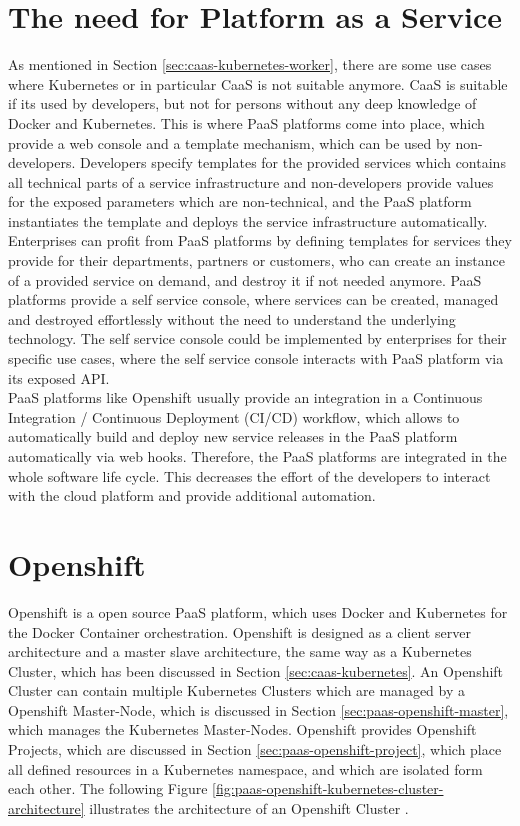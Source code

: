 \section{The need for Platform as a Service}
\label{sec:paas-need-for-paas}
As mentioned in Section \vref{sec:caas-kubernetes-worker}, there are some use cases where Kubernetes or in particular CaaS is not suitable anymore. CaaS is suitable if its used by developers, but not for persons without any deep knowledge of Docker and Kubernetes. This is where PaaS platforms come into place, which provide a web console and a template mechanism, which can be used by non-developers. Developers specify templates for the provided services which contains all technical parts of a service infrastructure and non-developers provide values for the exposed parameters which are non-technical, and the PaaS platform instantiates the template and deploys the service infrastructure automatically. \\

Enterprises can profit from PaaS platforms by defining templates for services they provide for their departments, partners or customers, who can create an instance of a provided service on demand, and destroy it if not needed anymore. PaaS platforms provide a self service console, where services can be created, managed and destroyed effortlessly without the need to understand the underlying technology. The self service console could be implemented by enterprises for their specific use cases, where the self service console interacts with PaaS platform via its exposed API. \\

PaaS platforms like Openshift usually provide an integration in a Continuous Integration / Continuous Deployment (CI/CD) workflow, which allows to automatically build and deploy new service releases in the PaaS platform automatically via web hooks. Therefore, the PaaS platforms are integrated in the whole software life cycle. This decreases the effort of the developers to interact with the cloud platform and provide additional automation.
 
\section{Openshift}
\label{sec:paas-kubernetes}
Openshift is a open source PaaS platform, which uses Docker and Kubernetes for the Docker Container orchestration. Openshift is designed as a client server architecture and a master slave architecture, the same way as a Kubernetes Cluster, which has been discussed in Section \vref{sec:caas-kubernetes}. An Openshift Cluster can contain multiple Kubernetes Clusters which are managed by a Openshift Master-Node, which is discussed in Section \vref{sec:paas-openshift-master}, which manages the Kubernetes Master-Nodes. Openshift provides Openshift Projects, which are discussed in Section \vref{sec:paas-openshift-project}, which place all defined resources in a Kubernetes namespace, and which are isolated form each other. The following Figure \vref{fig:paas-openshift-kubernetes-cluster-architecture} illustrates the architecture of an Openshift Cluster \cite{OpenshiftDeepDive2014, OpenshiftCoreConcepts2018}.

